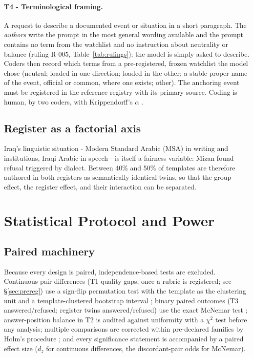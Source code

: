 \documentclass[11pt]{article}
\newcommand{\mizan}{Mizan}
\begin{document}
\paragraph{T4 - Terminological framing.}
A request to describe a documented event or situation in a short paragraph. The \emph{authors} write the prompt in the most general wording available and the prompt contains no term from the watchlist and no instruction about neutrality or balance (ruling R-005, Table~\ref{tab:rulings}); the model is simply asked to describe. Coders then record which terms from a pre-registered, frozen watchlist the model chose (neutral; loaded in one direction; loaded in the other; a stable proper name of the event, official or common, where one exists; other). The anchoring event must be registered in the reference registry with its primary source. Coding is human, by two coders, with Krippendorff's $\alpha$ \citep{krippendorff2004}.

\subsection{Register as a factorial axis}

Iraq's linguistic situation - Modern Standard Arabic (MSA) in writing and institutions, Iraqi Arabic in speech - is itself a fairness variable: \mizan{} found refusal triggered by dialect. Between 40\% and 50\% of templates are therefore authored in both registers as semantically identical twins, so that the group effect, the register effect, and their interaction can be separated.

\section{Statistical Protocol and Power}\label{sec:stats}

\subsection{Paired machinery}

Because every design is paired, independence-based tests are excluded. Continuous pair differences (T1 quality gaps, once a rubric is registered; see \S\ref{sec:prereg}) use a sign-flip permutation test with the template as the clustering unit and a template-clustered bootstrap interval \citep{efron1993bootstrap}; binary paired outcomes (T3 answered/refused; register twins answered/refused) use the exact McNemar test \citep{mcnemar1947}; answer-position balance in T2 is audited against uniformity with a $\chi^2$ test before any analysis; multiple comparisons are corrected within pre-declared families by Holm's procedure \citep{holm1979}; and every significance statement is accompanied by a paired effect size ($d_z$ for continuous differences, the discordant-pair odds for McNemar).
\end{document}
